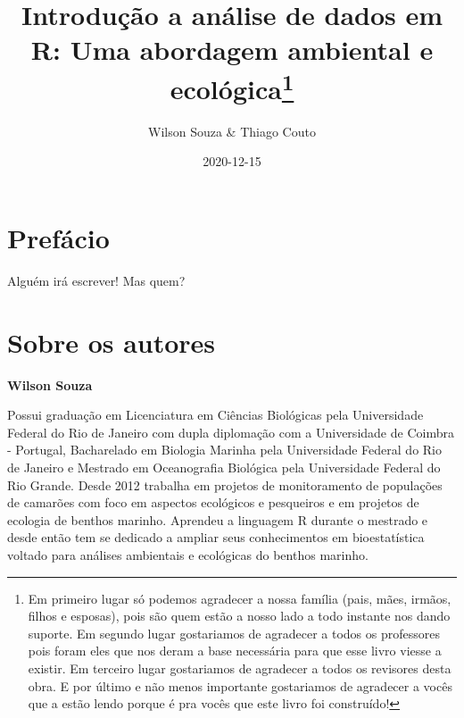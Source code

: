 \documentclass[titlepage, oneside, openany, a4paper]{book}
\title{Introdução a análise de dados em R: Uma abordagem ambiental e ecológica\thanks{Em primeiro lugar só podemos agradecer a nossa família (pais, mães, irmãos, filhos e esposas), pois são quem estão a nosso lado a todo instante nos dando suporte. Em segundo lugar gostariamos de agradecer a todos os professores pois foram eles que nos deram a base necessária para que esse livro viesse a existir. Em terceiro lugar gostariamos de agradecer a todos os revisores desta obra. E por último e não menos importante gostariamos de agradecer a vocês que a estão lendo porque é pra vocês que este livro foi construído!}}
\author{Wilson Souza \& Thiago Couto}
\date{2020-12-15}
\let\oldmaketitle\maketitle
\begin{document}
\maketitle


\begin{figure}
  
\end{figure}

\let\maketitle\oldmaketitle
\maketitle

\renewcommand*\contentsname{Índice}
{
\hypersetup{linkcolor=}
\setcounter{tocdepth}{1}
\tableofcontents
}
\listoftables
\listoffigures
\hypertarget{prefuxe1cio}{%
\chapter*{Prefácio}\label{prefuxe1cio}}

Alguém irá escrever! Mas quem?

\hypertarget{sobre-os-autores}{%
\chapter*{Sobre os autores}\label{sobre-os-autores}}

\textbf{Wilson Souza}

Possui graduação em Licenciatura em Ciências Biológicas pela Universidade Federal do Rio de Janeiro com dupla diplomação com a Universidade de Coimbra - Portugal, Bacharelado em Biologia Marinha pela Universidade Federal do Rio de Janeiro e Mestrado em Oceanografia Biológica pela Universidade Federal do Rio Grande. Desde 2012 trabalha em projetos de monitoramento de populações de camarões com foco em aspectos ecológicos e pesqueiros e em projetos de ecologia de benthos marinho. Aprendeu a linguagem R durante o mestrado e desde então tem se dedicado a ampliar seus conhecimentos em bioestatística voltado para análises ambientais e ecológicas do benthos marinho.
\end{document}
